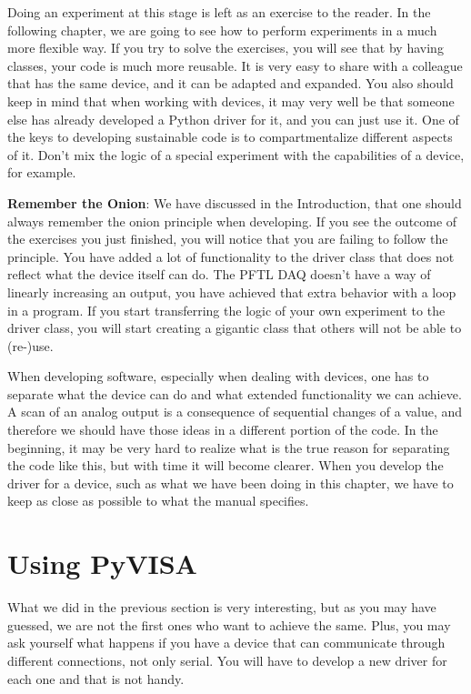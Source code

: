 
Doing an experiment at this stage is left as an exercise to the reader. In the following chapter, we are going to see how to perform experiments in a much more flexible way. If you try to solve the exercises, you will see that by having classes, your code is much more reusable.
It is very easy to share with a colleague that has the same device, and
it can be adapted and expanded. You also should keep in mind that when
working with devices, it may very well be that someone else has already
developed a Python driver for it, and you can just use it. One of the
keys to developing sustainable code is to compartmentalize different
aspects of it. Don't mix the logic of a special experiment with the
capabilities of a device, for example.

\textbf{Remember the Onion}: We have discussed in the Introduction, that
one should always remember the onion principle when developing. If you
see the outcome of the exercises you just finished, you will notice that
you are failing to follow the principle. You have added a lot of
functionality to the driver class that does not reflect what the device
itself can do. The {PFTL DAQ} doesn't have a way of linearly
increasing an output, you have achieved that extra behavior with a loop
in a program. If you start transferring the logic of your own experiment
to the driver class, you will start creating a gigantic class that
others will not be able to (re-)use.

When developing software, especially when dealing with devices, one has
to separate what the device can do and what extended functionality we
can achieve. A scan of an analog output is a consequence of sequential changes of a value,
and therefore we should have those ideas in a different portion of the code. In the beginning, it may be very hard to realize what is the true reason for separating the code like this, but with time it will become clearer. When you develop the driver
for a device, such as what we have been doing in this chapter, we have to keep as close as possible to what the manual specifies. 

\section{Using PyVISA}\label{section:pyvisa}
What we did in the previous section is very interesting, but as you may have guessed, we are not the first ones who want to achieve the same. Plus, you may ask yourself what happens if you have a device that can communicate through different connections, not only serial. You will have to develop a new driver for each one and that is not handy. 

